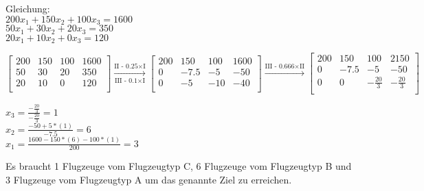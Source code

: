 \documentclass{article}
\begin{document}
Gleichung:\\
\(200x_1 + 150x_2 + 100x_3 = 1600\)\\
\(50x_1 + 30x_2 + 20x_3 = 350\)\\
\(20x_1 + 10x_2 + 0x_3 = 120\)

\[
\begin{bmatrix} 
200 & 150 & 100 & 1600 \\
50 & 30 & 20 & 350 \\
20 & 10 & 0 & 120 \\
\end{bmatrix}
\xrightarrow[\text{III - 0.1}\times\text{I}]{\text{II - 0.25}\times\text{I}}
\begin{bmatrix} 
200 & 150 & 100 & 1600 \\
0 & -7.5 & -5 & -50 \\
0 & -5 & -10 & -40 \\
\end{bmatrix}
\xrightarrow{\text{III - 0.666}\times\text{II}}
\begin{bmatrix} 
200 & 150 & 100 & 2150 \\
0 & -7.5 & -5 & -50 \\
0 & 0 & -\frac{20}{3} & -\frac{20}{3} \\
\end{bmatrix}
\]

\(x_3 = \frac{-\frac{20}{3}}{-\frac{20}{3}} = 1\)\\
\(x_2 = \frac{-50 + 5*(1)}{-7.5} = 6\)\\
\(x_1 = \frac{1600 - 150*(6) - 100*(1)}{200} = 3\)

Es braucht 1 Flugzeuge vom Flugzeugtyp C, 6 Flugzeuge vom Flugzeugtyp B und 3 Flugzeuge vom Flugzeugtyp A um das genannte Ziel zu erreichen.
\end{document}
